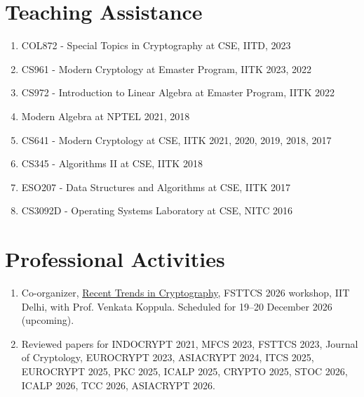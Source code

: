 \documentclass[margin]{res} %
\begin{document}
\begin{resume}

\section{Teaching Assistance}
\begin{enumerate}
    \item COL872 - Special Topics in Cryptography at CSE, IITD, 2023
    \item CS961 - Modern Cryptology at Emaster Program, IITK 2023, 2022
    \item CS972 - Introduction to Linear Algebra at Emaster Program, IITK 2022
    \item Modern Algebra at NPTEL 2021, 2018
    \item CS641 - Modern Cryptology at CSE, IITK 2021, 2020, 2019, 2018, 2017
    \item CS345 - Algorithms II at CSE, IITK 2018
    \item ESO207 - Data Structures and Algorithms at CSE, IITK 2017
    \item CS3092D - Operating Systems Laboratory at CSE, NITC 2016
\end{enumerate}


\section{Professional Activities}
\begin{enumerate}
    \item Co-organizer, \href{https://mahe94.github.io/workshops/FSTTCS-2026/}{Recent Trends in Cryptography}, FSTTCS 2026 workshop, IIT Delhi, with Prof. Venkata Koppula. Scheduled for 19--20 December 2026 (upcoming).

    \item Reviewed papers for INDOCRYPT 2021, MFCS 2023, FSTTCS 2023, Journal of Cryptology, EUROCRYPT 2023, ASIACRYPT 2024, ITCS 2025, EUROCRYPT 2025, PKC 2025, ICALP 2025, CRYPTO 2025, STOC 2026, ICALP 2026, TCC 2026, ASIACRYPT 2026.


\end{enumerate}
\end{resume}
\end{document}
